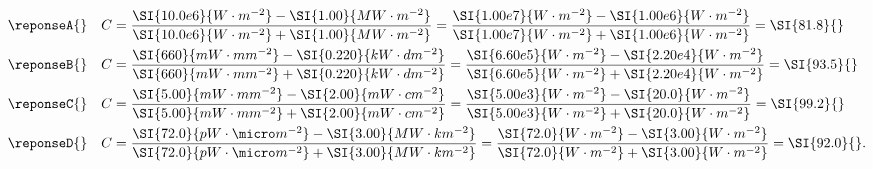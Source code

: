 \begin{enonce}
	
\end{enonce}
	
	\reponse{\reponseC{}}
	
	\begin{corrige}
		\begin{align*}
			\text{\reponseA{}} \quad C &= \frac{ \SI{10.0e6}{W \cdot m^{-2}} - \SI{1.00}{MW \cdot m^{-2}} }{ \SI{10.0e6}{W \cdot m^{-2}} + \SI{1.00}{MW \cdot m^{-2}} } = \frac{ \SI{1.00e7}{W \cdot m^{-2}} -  \SI{1.00e6}{W \cdot m^{-2}}}{\SI{1.00e7}{W \cdot m^{-2}} +  \SI{1.00e6}{W \cdot m^{-2}}} = \SI{81.8}{}\\
			\text{\reponseB{}} \quad C &= \frac{\SI{660}{mW \cdot mm^{-2}} - \SI{0.220}{kW \cdot dm^{-2}}}{\SI{660}{mW \cdot mm^{-2}} + \SI{0.220}{kW \cdot dm^{-2}}} = \frac{ \SI{6.60e5}{W \cdot m^{-2}} -  \SI{2.20e4}{W \cdot m^{-2}}}{\SI{6.60e5}{W \cdot m^{-2}} +  \SI{2.20e4}{W \cdot m^{-2}}} = \SI{93.5}{}\\
			\text{\reponseC{}} \quad C &= \frac{\SI{5.00}{mW \cdot mm^{-2}} - \SI{2.00}{mW \cdot cm^{-2}}}{\SI{5.00}{mW \cdot mm^{-2}} + \SI{2.00}{mW \cdot cm^{-2}}} = \frac{ \SI{5.00e3}{W \cdot m^{-2}} -  \SI{20.0}{W \cdot m^{-2}}}{\SI{5.00e3}{W \cdot m^{-2}} +  \SI{20.0}{W \cdot m^{-2}}} = \SI{99.2}{}\\
			\text{\reponseD{}} \quad C &= \frac{\SI{72.0}{pW \cdot \micro m^{-2}} - \SI{3.00}{MW \cdot km^{-2}}}{\SI{72.0}{pW \cdot \micro m^{-2}} + \SI{3.00}{MW \cdot km^{-2}}} = \frac{ \SI{72.0}{W \cdot m^{-2}} -  \SI{3.00}{W \cdot m^{-2}}}{\SI{72.0}{W \cdot m^{-2}} +  \SI{3.00}{W \cdot m^{-2}}} =\SI{92.0}{}.
		\end{align*}



	\end{corrige}
	


\finEntrainement






\hauteurLargeurCadreReponse		{6mm}{2cm}
\initialisationEntrainement


